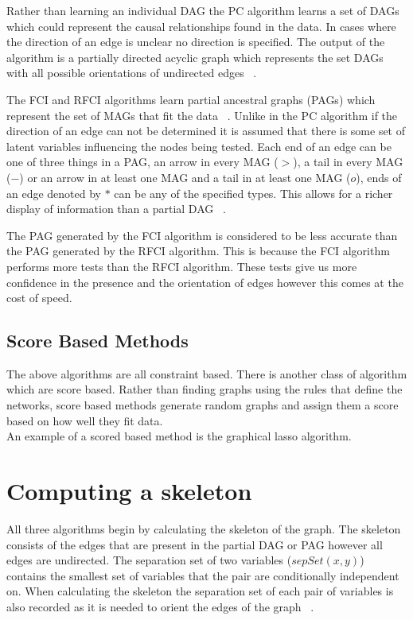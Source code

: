 \documentclass{UoYCSproject}
\begin{document}
Rather than learning an individual DAG the PC algorithm learns a set of DAGs which could represent the causal relationships found in the data. In cases where the direction of an edge is unclear no direction is specified. The output of the algorithm is a partially directed acyclic graph which represents the set DAGs with all possible orientations of undirected edges ~\parencite{spirtes1991algorithm}.

The FCI and RFCI algorithms learn partial ancestral graphs (PAGs) which represent the set of MAGs that fit the data  ~\parencite{colombo2012learning}. Unlike in the PC algorithm if the direction of an edge can not be determined it is assumed that there is some set of latent variables influencing the nodes being tested. Each end of an edge can be one of three things in a PAG, an arrow in every MAG ($>$), a tail in every MAG ($-$) or an arrow in at least one MAG and a tail in at least one MAG ($o$), ends of an edge denoted by $*$ can be any of the specified types. This allows for a richer display of information than a partial DAG ~\parencite{colombo2012learning}.

The PAG generated by the FCI algorithm is considered to be less accurate than the PAG generated by the RFCI algorithm. This is because the FCI algorithm performs more tests than the RFCI algorithm. These tests give us more confidence in the presence and the orientation of edges however this comes at the cost of speed.
\subsection{Score Based Methods}
The above algorithms are all constraint based. There is another class of algorithm which are score based. Rather than finding graphs using the rules that define the networks, score based methods generate random graphs and assign them a score based on how well they fit data.\\

An example of a scored based method is the graphical lasso algorithm. 

\section{Computing a skeleton}
All three algorithms begin by calculating the skeleton of the graph. The skeleton consists of the edges that are present in the partial DAG or PAG however all edges are undirected. The separation set of two variables ($sepSet(x,y)$) contains the smallest set of variables that the pair are conditionally independent on.  When calculating the skeleton the separation set of each pair of variables is also recorded as it is needed to orient the edges of the graph ~\parencite{colombo2012learning, spirtes1991algorithm}.
\end{document}
